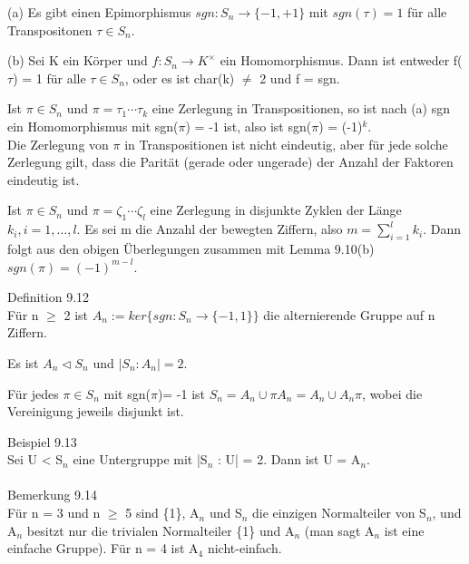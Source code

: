 \begin{compactenum}
\item[(a)] Es gibt einen Epimorphismus $sgn: S_n \to \{-1,+1\}$ mit $sgn(\tau) = 1$ für alle Transpositonen $\tau \in S_n$.
\item[(b)] Sei K ein Körper und $f: S_n \to K^\times$ ein Homomorphismus. Dann ist entweder f($\tau$) = 1 für alle $\tau \in S_n$, oder es ist char(k) $\neq$ 2 und f = sgn.
\end{compactenum}
\begin{compactitem}
\item Ist $\pi \in S_n$ und $\pi = \tau_1 \cdots \tau_k$ eine Zerlegung in Transpositionen, so ist nach (a) sgn ein Homomorphismus mit sgn($\pi$) = -1 ist, also ist sgn($\pi$) = (-1)$^k$.\\
Die Zerlegung von $\pi$ in Transpositionen ist nicht eindeutig, aber für jede solche Zerlegung gilt, dass die Parität (gerade oder ungerade) der Anzahl der Faktoren eindeutig ist.
\item Ist $\pi \in S_n$ und $\pi = \zeta_1 \cdots \zeta_l$ eine Zerlegung in disjunkte Zyklen der Länge $k_i, i = 1, …, l$. Es sei m die Anzahl der bewegten Ziffern, also $m = \sum\nolimits_{i=1}^{l} k_i$. Dann folgt aus den obigen Überlegungen zusammen mit Lemma 9.10(b) $sgn(\pi) = (-1)^{m-l}$.\\
\end{compactitem}
Definition 9.12\\
Für n $\ge$ 2 ist $A_n := ker\{sgn : S_n \to \{-1,1\}\}$ die alternierende Gruppe auf n Ziffern.
\begin{compactitem}
\item Es ist $A_n \vartriangleleft S_n$ und $|S_n : A_n| = 2$.
\item Für jedes $\pi \in S_n$ mit sgn($\pi$)= -1 ist $S_n = A_n \cup \pi A_n = A_n \cup A_n \pi$, wobei die Vereinigung jeweils disjunkt ist.\\
\end{compactitem}
Beispiel 9.13\\
Sei U < S$_n$ eine Untergruppe mit |S$_n$ : U| = 2. Dann ist U = A$_n$.\\
\\
Bemerkung 9.14\\
Für n = 3 und n $\ge$ 5 sind \{1\}, A$_n$ und S$_n$ die einzigen Normalteiler von S$_n$, und A$_n$ besitzt nur die trivialen Normalteiler \{1\} und A$_n$ (man sagt A$_n$ ist eine einfache Gruppe). Für n = 4 ist A$_4$ nicht-einfach.\\
\\
